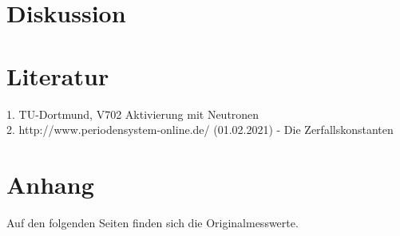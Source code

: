 \section{Diskussion}
\label{sec:diskussion}




\section{Literatur}
\label{sec:literatur}
1. TU-Dortmund, V702 Aktivierung mit Neutronen\\
2. http://www.periodensystem-online.de/ (01.02.2021) - Die Zerfallskonstanten

\section{Anhang}
\label{sec:anhang}
Auf den folgenden Seiten finden sich die Originalmesswerte.